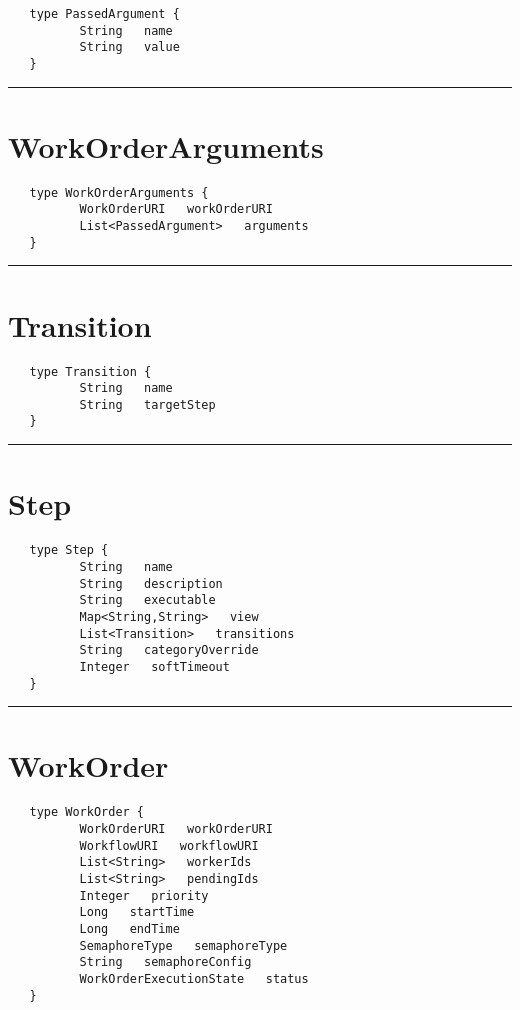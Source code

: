 \begin{Verbatim}
   type PassedArgument {
          String   name
          String   value
   }
\end{Verbatim}

\rule{12cm}{2pt}
\section{WorkOrderArguments}
\label{type:WorkOrderArguments}

\begin{Verbatim}
   type WorkOrderArguments {
          WorkOrderURI   workOrderURI
          List<PassedArgument>   arguments
   }
\end{Verbatim}

\rule{12cm}{2pt}
\section{Transition}
\label{type:Transition}

\begin{Verbatim}
   type Transition {
          String   name
          String   targetStep
   }
\end{Verbatim}

\rule{12cm}{2pt}
\section{Step}
\label{type:Step}

\begin{Verbatim}
   type Step {
          String   name
          String   description
          String   executable
          Map<String,String>   view
          List<Transition>   transitions
          String   categoryOverride
          Integer   softTimeout
   }
\end{Verbatim}

\rule{12cm}{2pt}
\section{WorkOrder}
\label{type:WorkOrder}

\begin{Verbatim}
   type WorkOrder {
          WorkOrderURI   workOrderURI
          WorkflowURI   workflowURI
          List<String>   workerIds
          List<String>   pendingIds
          Integer   priority
          Long   startTime
          Long   endTime
          SemaphoreType   semaphoreType
          String   semaphoreConfig
          WorkOrderExecutionState   status
   }
\end{Verbatim}

